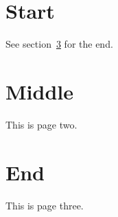 \documentclass{article}
\begin{document}
\section{Start}
See section~\ref{sec:end} for the end.
\newpage
\section{Middle}
This is page two.
\newpage
\section{End}\label{sec:end}
This is page three.
\end{document}
